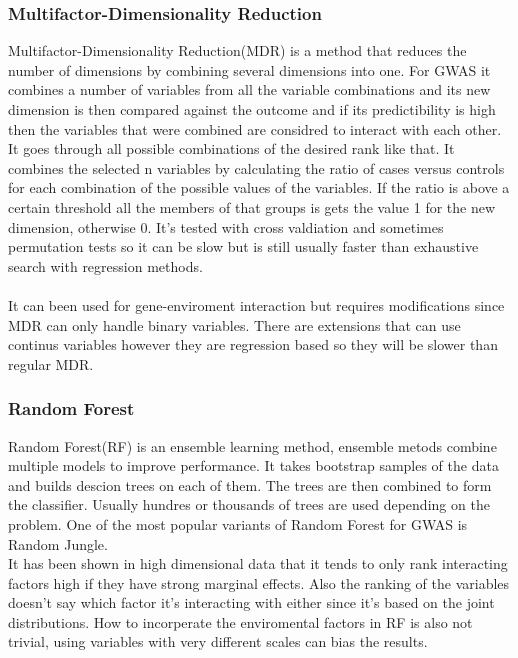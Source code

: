 \documentclass[10pt,a4paper]{article}
\begin{document}
\subsubsection{Multifactor-Dimensionality Reduction}
Multifactor-Dimensionality Reduction(MDR) is a method that reduces the number of dimensions by combining several dimensions into one. For GWAS it combines a number of variables from all the variable combinations and its new dimension is then compared against the outcome and if its predictibility is high then the variables that were combined are considred to interact with each other. It goes through all possible combinations of the desired rank like that. It combines the selected n variables by calculating the ratio of cases versus controls for each combination of the possible values of the variables. If the ratio is above a certain threshold all the members of that groups is gets the value 1 for the new dimension, otherwise 0. It's tested with cross valdiation and sometimes permutation tests so it can be slow but is still usually faster than exhaustive search with regression methods.\cite{cordell_detect_review,mdr_2001}\\
\\

It can been used for gene-enviroment interaction but requires modifications since MDR can only handle binary variables. There are extensions that can use continus variables however they are regression based so they will be slower than regular MDR.\cite{gene_enviroment_2013}

\subsubsection{Random Forest}
Random Forest(RF) is an ensemble learning method, ensemble metods combine multiple models to improve performance. It takes bootstrap samples of the data and builds descion trees on each of them. The trees are then combined to form the classifier. Usually hundres or thousands of trees are used depending on the problem\cite{random_forest}. One of the most popular variants of Random Forest for GWAS is Random Jungle.\cite{random_jungle}
\\
It has been shown in high dimensional data that it tends to only rank interacting factors high if they have strong marginal effects\cite{winham_rf_2012}. Also the ranking of the variables doesn't say which factor it's interacting with either since it's based on the joint distributions\cite{gene_enviroment_2013}. How to incorperate the enviromental factors in RF is also not trivial, using variables with very different scales can bias the results\cite{gene_enviroment_2013}.
\end{document}
